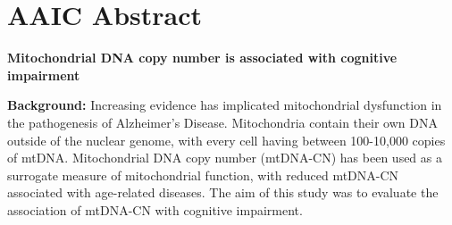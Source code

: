\documentclass[]{book}
\newenvironment{Shaded}{\begin{snugshade}}{\end{snugshade}}
\newcommand{\DataTypeTok}[1]{\textcolor[rgb]{0.13,0.29,0.53}{#1}}
\newcommand{\KeywordTok}[1]{\textcolor[rgb]{0.13,0.29,0.53}{\textbf{#1}}}
\newcommand{\NormalTok}[1]{#1}
\newcommand{\OperatorTok}[1]{\textcolor[rgb]{0.81,0.36,0.00}{\textbf{#1}}}
\newcommand{\StringTok}[1]{\textcolor[rgb]{0.31,0.60,0.02}{#1}}
\begin{document}
\hypertarget{aaic-abstract}{%
\chapter{AAIC Abstract}\label{aaic-abstract}}

\textbf{Mitochondrial DNA copy number is associated with cognitive impairment}

\textbf{Background:} Increasing evidence has implicated mitochondrial dysfunction in the pathogenesis of Alzheimer's Disease. Mitochondria contain their own DNA outside of the nuclear genome, with every cell having between 100-10,000 copies of mtDNA. Mitochondrial DNA copy number (mtDNA-CN) has been used as a surrogate measure of mitochondrial function, with reduced mtDNA-CN associated with age-related diseases. The aim of this study was to evaluate the association of mtDNA-CN with cognitive impairment.

\begin{Shaded}
\end{Shaded}
\end{document}
